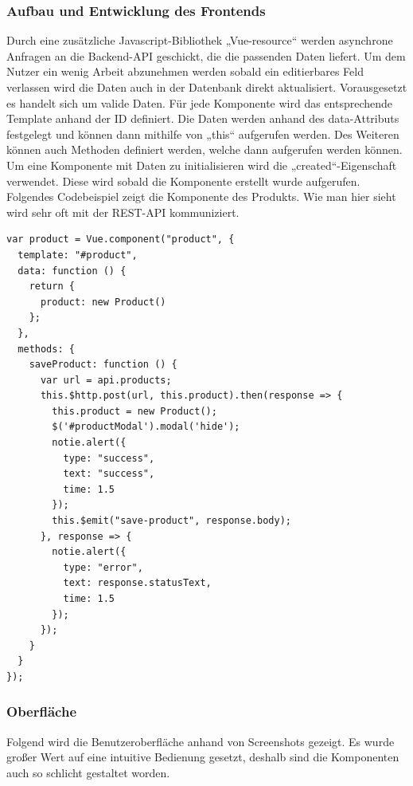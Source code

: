 \subsubsection{Aufbau und Entwicklung des Frontends}  
\label{sec:Aufbau und Entwicklung des Frontends-1}

Durch eine zusätzliche Javascript-Bibliothek „Vue-resource“ werden asynchrone Anfragen an die Backend-API geschickt, die die passenden Daten liefert. Um dem Nutzer ein wenig Arbeit abzunehmen werden sobald ein editierbares Feld verlassen wird die Daten auch in der Datenbank direkt aktualisiert. Vorausgesetzt es handelt sich um valide Daten.
Für jede Komponente wird das entsprechende Template anhand der ID definiert.
Die Daten werden anhand des data-Attributs festgelegt und können dann mithilfe von „this“ aufgerufen werden. 
Des Weiteren können auch Methoden definiert werden, welche dann aufgerufen werden können. Um eine Komponente mit Daten zu initialisieren wird die „created“-Eigenschaft verwendet. Diese wird sobald die Komponente erstellt wurde aufgerufen. Folgendes Codebeispiel zeigt die Komponente des Produkts. Wie man hier sieht wird sehr oft mit der REST-API kommuniziert.

\begin{lstlisting}[frame=single]
var product = Vue.component("product", {
  template: "#product",
  data: function () {
    return {
      product: new Product()
    };
  },
  methods: {
    saveProduct: function () {
      var url = api.products;
      this.$http.post(url, this.product).then(response => {
        this.product = new Product();
        $('#productModal').modal('hide');
        notie.alert({
          type: "success",
          text: "success",
          time: 1.5
        });
        this.$emit("save-product", response.body);
      }, response => {
        notie.alert({
          type: "error",
          text: response.statusText,
          time: 1.5
        });
      });
    }
  }
});
\end{lstlisting}

\clearpage

\subsubsection{Oberfläche}  
\label{sec:Oberfläche-1}

Folgend wird die Benutzeroberfläche anhand von Screenshots gezeigt. Es wurde großer Wert auf eine intuitive Bedienung gesetzt, deshalb sind die Komponenten auch so schlicht gestaltet worden.

